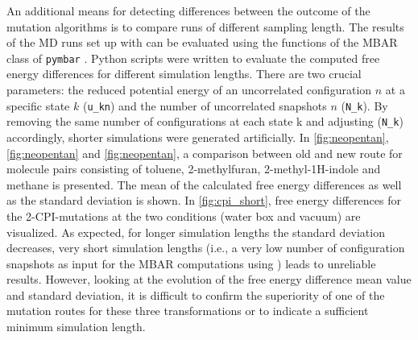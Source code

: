 An additional means for detecting differences between the outcome of the mutation algorithms is to compare runs of different sampling length. 
The results of the MD runs set up with {\trafo} can be evaluated using the functions of the MBAR class of \texttt{pymbar} \cite{Shirts.2008}. Python scripts were written to evaluate the computed free energy differences for different simulation lengths. There are two crucial parameters: the reduced potential energy of an uncorrelated configuration $n$ at a specific state $k$ (\texttt{u\_kn}) and the number of uncorrelated snapshots $n$ (\texttt{N\_k}). By removing the same number of configurations at each state k and adjusting (\texttt{N\_k}) accordingly, shorter simulations were generated artificially.
In \ref{fig:neopentan}, \ref{fig:neopentan} and \ref{fig:neopentan}, a comparison between old and new route for molecule pairs consisting of toluene, 2-methylfuran, 2-methyl-1H-indole and methane is presented. The mean of the calculated free energy differences as well as the standard deviation is shown. In \ref{fig:cpi_short}, free energy differences for the 2-CPI-mutations at the two conditions (water box and vacuum) are visualized. 
As expected, for longer simulation lengths the standard deviation decreases, very short simulation lengths (i.e., a very low number of configuration snapshots as input for the MBAR computations using ) leads to unreliable results. However, looking at the evolution of the free energy difference mean value and standard deviation, it is difficult to confirm the superiority of one of the mutation routes for these three transformations or to indicate a sufficient minimum simulation length.



